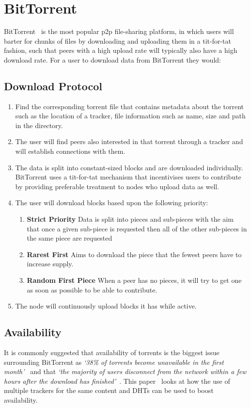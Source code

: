 
\section{BitTorrent}

BitTorrent~\cite{kaune_unraveling_2010,pouwelse_bittorrent_2005} is the most popular p2p file-sharing platform, in which users will barter for chunks of files by downloading and uploading them in a tit-for-tat fashion, such that peers with a high upload rate will typically also have a high download rate. For a user to download data from BitTorrent they would:

\subsection*{Download Protocol}

\begin{enumerate}
  \item Find the corresponding \.torrent file that contains metadata about the torrent such as the location of a tracker, file information such as name, size and path in the directory.
  \item The user will find peers also interested in that torrent through a tracker and will establish connections with them.
  \item The data is split into constant-sized blocks and are downloaded individually. BitTorrent uses a tit-for-tat mechanism that incentivises users to contribute by providing preferable treatment to nodes who upload data as well.
  \item The user will download blocks based upon the following priority:
        \begin{enumerate}
          \item \textbf{Strict Priority} Data is split into pieces and sub-pieces with the aim that once a given sub-piece is requested then all of the other sub-pieces in the same piece are requested
          \item \textbf{Rarest First} Aims to download the piece that the fewest peers have to increase supply.
          \item \textbf{Random First Piece} When a peer has no pieces, it will try to get one as soon as possible to be able to contribute.
        \end{enumerate}
  \item The node will continuously upload blocks it has while active.
\end{enumerate}

\subsection*{Availability}
\label{subsec:availability}

It is commonly suggested that availability of torrents is the biggest issue surrounding BitTorrent as \textit{`38\% of torrents become unavailable in the first month'}~\cite{kaune_unraveling_2010} and that \textit{`the majority of users disconnect from the network within a few hours after the download has finished'}~\cite{pouwelse_bittorrent_2005}.
This paper~\cite{neglia_availability_2007} looks at how the use of multiple trackers for the same content and DHTs can be used to boost availability.

